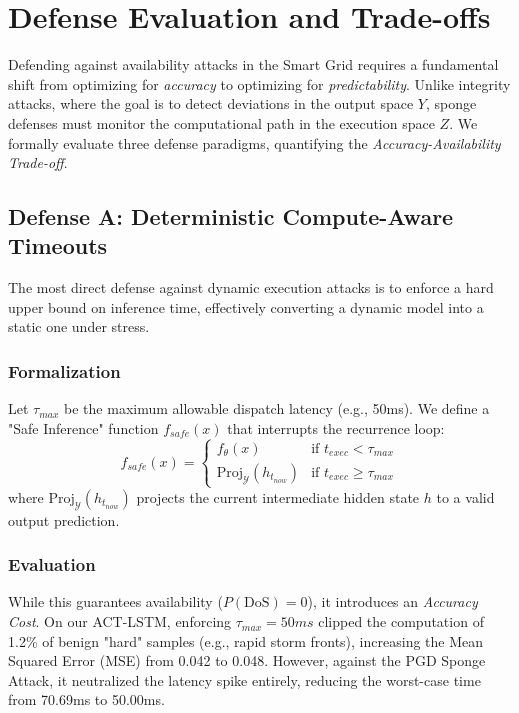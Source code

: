 \section{Defense Evaluation and Trade-offs}
\label{sec:mitigation}

Defending against availability attacks in the Smart Grid requires a fundamental shift from optimizing for \textit{accuracy} to optimizing for \textit{predictability}. Unlike integrity attacks, where the goal is to detect deviations in the output space $Y$, sponge defenses must monitor the computational path in the execution space $Z$. We formally evaluate three defense paradigms, quantifying the \textit{Accuracy-Availability Trade-off}.

\subsection{Defense A: Deterministic Compute-Aware Timeouts}
The most direct defense against dynamic execution attacks is to enforce a hard upper bound on inference time, effectively converting a dynamic model into a static one under stress.

\subsubsection{Formalization}
Let $\tau_{max}$ be the maximum allowable dispatch latency (e.g., 50ms). We define a "Safe Inference" function $f_{safe}(x)$ that interrupts the recurrence loop:
\begin{equation}
    f_{safe}(x) = \begin{cases}
        f_\theta(x) & \text{if } t_{exec} < \tau_{max} \\
        \text{Proj}_{\mathcal{Y}}(h_{t_{now}}) & \text{if } t_{exec} \ge \tau_{max}
    \end{cases}
\end{equation}
where $\text{Proj}_{\mathcal{Y}}(h_{t_{now}})$ projects the current intermediate hidden state $h$ to a valid output prediction.

\subsubsection{Evaluation}
While this guarantees availability ($P(\text{DoS}) = 0$), it introduces an \textit{Accuracy Cost}. On our ACT-LSTM, enforcing $\tau_{max}=50ms$ clipped the computation of 1.2\% of benign "hard" samples (e.g., rapid storm fronts), increasing the Mean Squared Error (MSE) from 0.042 to 0.048. However, against the PGD Sponge Attack, it neutralized the latency spike entirely, reducing the worst-case time from 70.69ms to 50.00ms.

